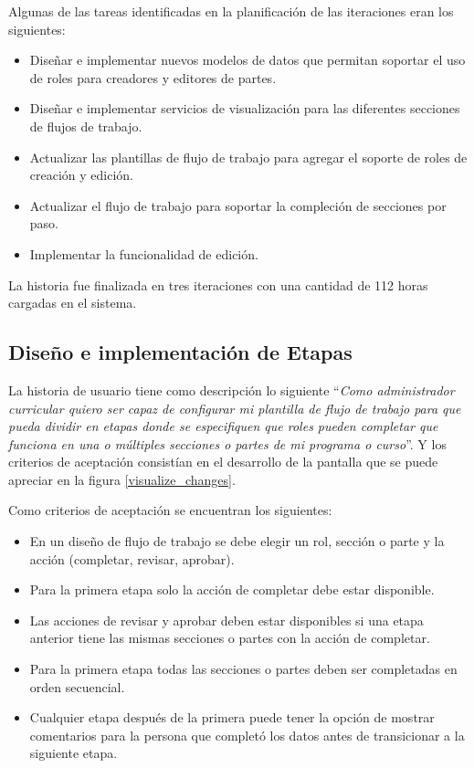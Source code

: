Algunas de las tareas identificadas en la planificación de las iteraciones eran los siguientes:
\begin{itemize}
	\item Diseñar e implementar nuevos modelos de datos que permitan soportar el uso de roles para creadores y editores de partes.
	\item Diseñar e implementar servicios de visualización para las diferentes secciones de flujos de trabajo.
	\item Actualizar las plantillas de flujo de trabajo para agregar el soporte de roles de creación y edición.
	\item Actualizar el flujo de trabajo para soportar la compleción de secciones por paso.
	\item Implementar la funcionalidad de edición.
\end{itemize}

La historia fue finalizada en tres iteraciones con una cantidad de 112 horas cargadas en el sistema.


\subsection{Diseño e implementación de Etapas}
La historia de usuario tiene como descripción lo siguiente \enquote{\textit{Como administrador curricular quiero ser capaz de configurar mi plantilla de flujo de trabajo para que pueda dividir en etapas donde se especifiquen que roles pueden completar que funciona en una o múltiples secciones o partes de mi programa o curso}}. Y los criterios de aceptación consistían en el desarrollo de la pantalla que se puede apreciar en la figura \ref{visualize_changes}.

Como criterios de aceptación se encuentran los siguientes:
\begin{itemize}
	\item En un diseño de flujo de trabajo se debe elegir un rol, sección o parte y la acción (completar, revisar, aprobar).
	\item Para la primera etapa solo la acción de completar debe estar disponible.
	\item Las acciones de revisar y aprobar deben estar disponibles si una etapa anterior tiene las mismas secciones o partes con la acción de completar.
	\item Para la primera etapa todas las secciones o partes deben ser completadas en orden secuencial.
	\item Cualquier etapa después de la primera puede tener la opción de mostrar comentarios para la persona que completó los datos antes de transicionar a la siguiente etapa.
\end{itemize}

